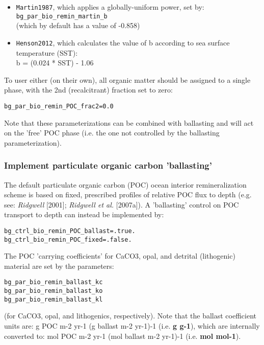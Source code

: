 \documentclass[11pt,fleqn]{book} %
\begin{document}
\begin{itemize}[noitemsep]

\vspace{1mm}
\item \texttt{Martin1987}, which applies a globally-uniform power, set by:
  \\ \texttt{bg\_par\_bio\_remin\_martin\_b}
  \\(which by default has a value of -0.858)

\vspace{1mm}
\item \texttt{Henson2012}, which calculates the value of b according to sea surface temperature (SST):
  \\b = (0.024 * SST) - 1.06

\end{itemize}

To user either (on their own), all organic matter should be assigned to a single phase, with the 2nd (recalcitrant) fraction set to zero:
\vspace{-2pt}\begin{verbatim}
bg_par_bio_remin_POC_frac2=0.0
\end{verbatim}\vspace{-2pt}

Note that these parameterizations can be combined with ballasting and will act on the 'free' POC phase (i.e. the one not controlled by the ballasting parameterization).

%
\subsubsection{Implement particulate organic carbon 'ballasting'}
\vspace{1mm}

The default particulate organic carbon (POC) ocean interior remineralization scheme is based on fixed, prescribed profiles of relative POC flux to depth (e.g. see: \textit{Ridgwell} [2001]; \textit{Ridgwell et al.} [2007a]). A 'ballasting' control on POC transport to depth can instead be implemented by:
\vspace{-2pt}\begin{verbatim}
bg_ctrl_bio_remin_POC_ballast=.true.
bg_ctrl_bio_remin_POC_fixed=.false.
\end{verbatim}\vspace{-2pt}

The POC 'carrying coefficients' for CaCO3, opal, and detrital (lithogenic) material are set by the parameters:
\vspace{-2pt}\begin{verbatim}
bg_par_bio_remin_ballast_kc
bg_par_bio_remin_ballast_ko
bg_par_bio_remin_ballast_kl
\end{verbatim}\vspace{-2pt}
(for CaCO3, opal, and lithogenics, respectively). Note that the ballast coefficient units are: g POC m-2 yr-1 (g ballast m-2 yr-1)-1 (i.e. \textbf{g g-1}), which are internally converted to: mol POC m-2 yr-1 (mol ballast m-2 yr-1)-1 (i.e. \textbf{mol mol-1}).
\end{document}
